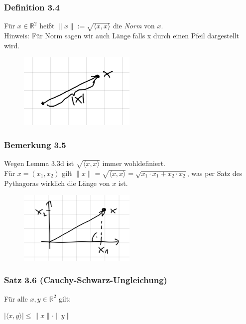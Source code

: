 \documentclass{article}
\begin{document}
\subsubsection*{Definition 3.4}
Für $x \in \mathbb{R}^2$ heißt $\|x\| := \sqrt{\langle x,x \rangle}$ die \textit{Norm} von $x$. \\
Hinweis: Für Norm sagen wir auch Länge falls x durch einen Pfeil dargestellt wird. \\

\begin{figure}[h]
    \centering
    \includegraphics[width=0.5\textwidth]{Images/3.4.jpeg}
    \caption{}
\end{figure}

\subsubsection*{Bemerkung 3.5}
Wegen Lemma 3.3d ist $\sqrt{\langle x,x \rangle}$ immer wohldefiniert. \\
Für $x=(x_1, x_2)$ gilt $\|x\| = \sqrt{\langle x,x \rangle} = \sqrt{x_1 \cdot x_1 + x_2 \cdot x_2}$, was per Satz des Pythagoras wirklich die Länge von $x$ ist. \\

\begin{figure}[h]
    \centering
    \includegraphics[width=0.5\textwidth]{Images/3.5.jpeg}
    \caption{}
\end{figure}

\subsubsection*{Satz 3.6 (Cauchy-Schwarz-Ungleichung)}
Für alle $x,y \in \mathbb{R}^2$ gilt: \\
\begin{center}
    $|\langle x,y \rangle| \leq \|x\| \cdot \|y\|$
\end{center}
\end{document}
